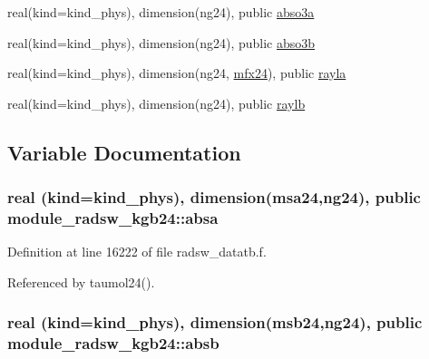 \begin{DoxyCompactItemize}
\item 
real(kind=kind\+\_\+phys), dimension(ng24), public \hyperlink{namespacemodule__radsw__kgb24_a3df78e9baa46df182aad6ff9b1662dc4}{abso3a}
\item 
real(kind=kind\+\_\+phys), dimension(ng24), public \hyperlink{namespacemodule__radsw__kgb24_a6b44aa0637523aa1f78de5b4d16c693b}{abso3b}
\item 
real(kind=kind\+\_\+phys), dimension(ng24, \hyperlink{namespacemodule__radsw__kgb24_a6fcafb0e1605ad49a252ed1e22b00a5b}{mfx24}), public \hyperlink{namespacemodule__radsw__kgb24_ab24774576414b5d210c34916c3d19404}{rayla}
\item 
real(kind=kind\+\_\+phys), dimension(ng24), public \hyperlink{namespacemodule__radsw__kgb24_a927fc4a43727d3e0735448c1cdc60458}{raylb}
\end{DoxyCompactItemize}


\subsection{Variable Documentation}
\subsubsection[{\texorpdfstring{absa}{absa}}]{\setlength{\rightskip}{0pt plus 5cm}real (kind=kind\+\_\+phys), dimension({\bf msa24},ng24), public module\+\_\+radsw\+\_\+kgb24\+::absa}\hypertarget{namespacemodule__radsw__kgb24_a06965ec156c4e1d18d50a70ba43bd8e1}{}\label{namespacemodule__radsw__kgb24_a06965ec156c4e1d18d50a70ba43bd8e1}


Definition at line 16222 of file radsw\+\_\+datatb.\+f.



Referenced by taumol24().

\subsubsection[{\texorpdfstring{absb}{absb}}]{\setlength{\rightskip}{0pt plus 5cm}real (kind=kind\+\_\+phys), dimension({\bf msb24},ng24), public module\+\_\+radsw\+\_\+kgb24\+::absb}\hypertarget{namespacemodule__radsw__kgb24_abd4db3c9678fee17f2cfd4a3e290619a}{}\label{namespacemodule__radsw__kgb24_abd4db3c9678fee17f2cfd4a3e290619a}


